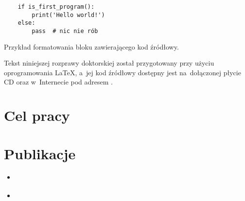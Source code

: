 \begin{listing}
  \begin{lstlisting}
    if is_first_program():
        print('Hello world!')
    else:
        pass  # nic nie rób
  \end{lstlisting}
\caption{Przykład formatowania bloku zawierającego kod źródłowy.}
\label{lst:example}
\end{listing}

Tekst niniejszej rozprawy doktorskiej został przygotowany przy użyciu oprogramowania \LaTeX,
  a~jej kod źródłowy dostępny jest na~dołączonej płycie CD oraz w~Internecie pod adresem \repourl{}.

\section{Cel pracy}\label{intro:goal}

\section{Publikacje}\label{intro:publications}
\begin{itemize}
  \item \cite{wieclaw21}
  \item \cite{stecko18}
\end{itemize}

